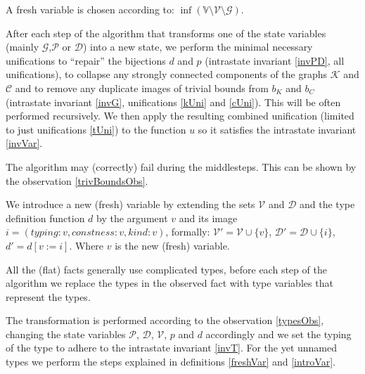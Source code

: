 \begin{defn}
    \label{freshVar}
    A fresh variable is chosen according to: \linebreak $\inf \left(\mathbb{V} \setminus \mathcal{V} \setminus \mathcal{G}\right)$.
\end{defn}

\begin{defn}
    \label{middlesteps}
    After each step of the algorithm that transforms one of the state variables (mainly $\mathcal{G}$,$\mathcal{P}$ or $\mathcal{D}$) into a new state, we perform the minimal necessary unifications to ``repair'' the bijections $d$ and $p$ (intrastate invariant \ref{invPD}, all unifications), to collapse any strongly connected components of the graphs $\mathcal{K}$ and  $\mathcal{C}$ and to remove any duplicate images of trivial bounds from $b_K$ and $b_C$ (intrastate invariant \ref{invG}, unifications \ref{kUni} and \ref{cUni}). This will be often performed recursively. We then apply the resulting combined unification (limited to just unifications \ref{tUni}) to the function $u$ so it satisfies the intrastate invariant \ref{invVar}. %
\end{defn}

\begin{lemma}
    The algorithm may (correctly) fail during the middlesteps. This can be shown by the observation \ref{trivBoundsObs}.
\end{lemma}

\begin{defn}
    \label{introVar}
    We introduce a new (fresh) variable by extending the sets $\mathcal{V}$ and $\mathcal{D}$
    and the type definition function $d$ by the argument $v$ and its image $i = (typing: v, constness: v, kind: v)$, formally: $\mathcal{V}' = \mathcal{V} \cup \{v\}$, $\mathcal{D}' = \mathcal{D} \cup \{i\}$, $d' = d [v := i]$. Where $v$ is the new (fresh) variable.
\end{defn}
\begin{defn}
    \label{presteps}
    All the (flat) facts generally use complicated types, before each step of the algorithm we replace the types in the observed fact with type variables that represent the types.

    The transformation is performed according to the observation \ref{typesObs}, changing the state variables $\mathcal{P}$, $\mathcal{D}$, $\mathcal{V}$, $p$ and $d$ accordingly and we set the typing of the type to adhere to the intrastate invariant \ref{invT}. For the yet unnamed types we perform the steps explained in definitions \ref{freshVar} and \ref{introVar}.
\end{defn}

